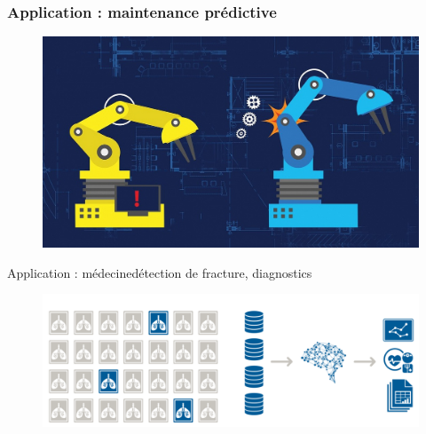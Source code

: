 \documentclass[compress]{beamer}
\begin{document}
\begin{frame}
	\frametitle{Application : maintenance prédictive}

	\begin{figure}
		\centering
		\includegraphics[width=1\linewidth]{resources/maintenance}

	\end{figure}

\end{frame}

\begin{frame}{Application : médecine}{détection de fracture, diagnostics}

	\begin{figure}
		\centering
		\includegraphics[width=1\linewidth]{resources/medical}
	\end{figure}

\end{frame}
\end{document}
